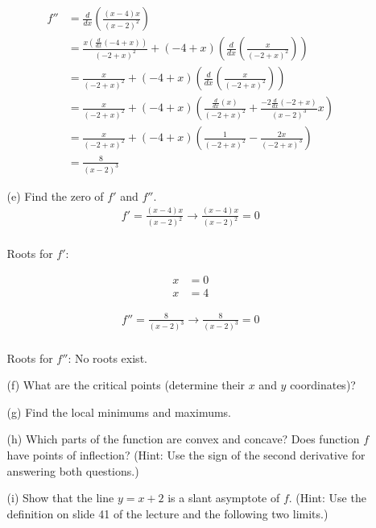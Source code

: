 \documentclass[a4paper]{article}
\begin{document}
\begin{enumerate}
\begin{enumerate}
		
\begin{align*}
	f'' &= \frac{d}{dx}(\frac{(x - 4)x}{(x - 2)^2})\\
	&= \frac{x(\frac{d}{dx}(-4 + x))}{(-2 + x)^2} + (-4 + x) (\frac{d}{dx}(\frac{x}{(-2 + x)^2}))\\
	&= \frac{x}{(-2 + x)^2} + (-4 + x)(\frac{d}{dx}(\frac{x}{(-2 + x)^2}))\\
	&=  \frac{x}{(-2 + x)^2} + (-4 + x) (\frac{\frac{d}{dx}(x)}{(-2 + x)^2} + \frac{-2 \frac{d}{dx}(-2 + x)}{(x - 2)^3}x)\\
	&= \frac{x}{(-2 + x)^2} + (-4 + x) (\frac{1}{(-2 + x)^2} - \frac{2x}{(-2 + x)^3})\\
	&= \frac{8}{(x - 2)^3}
\end{align*}
		
		
		\item[(e)] Find the zero of $f'$ and $f''$.\\
		
		
\begin{align*}
 f' = \frac{(x-4)x}{(x-2)^2} \rightarrow \frac{(x-4)x}{(x-2)^2} = 0\\
\end{align*}		
		
Roots for $f'$: 		
		
		\begin{align*}
	x &= 0\\
	x &= 4
\end{align*}

\begin{align*}
 f'' = \frac{8}{(x - 2)^3} \rightarrow \frac{8}{(x - 2)^3} = 0\\
\end{align*}

Roots for $f''$: No roots exist.

		
		\item[(f)] What are the critical points (determine their $x$ and $y$ coordinates)?\\
		
		\item[(g)] Find the local minimums and maximums.\\
		
		\item[(h)] Which parts of the function are convex and concave? Does function $f$ have points of inflection? (Hint: Use the sign of the second derivative for answering both questions.)
		
		\item[(i)] Show that the line $y = x + 2$ is a slant asymptote of $f$. (Hint: Use the definition on slide 41 of the lecture and the following two limits.)
		

\end{enumerate}
\end{enumerate}
\end{document}
